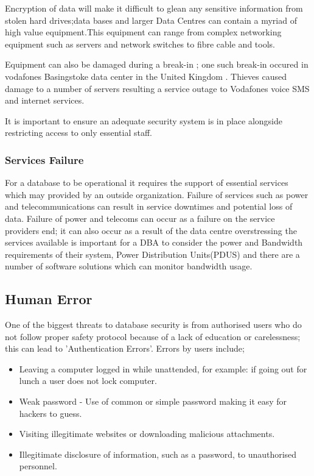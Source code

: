 \documentclass[11pt, twocolumn]{article}
\begin{document}
Encryption of data will make it  difficult to glean any sensitive information from stolen hard drives;data bases and larger Data Centres can contain a myriad of high value equipment.This equipment can range from complex networking equipment such as servers and network switches to fibre cable and tools.

Equipment can also be damaged during a break-in ; one such break-in occured in vodafones Basingstoke data center in the United Kingdom \cite{sean8}.  Thieves caused damage to a number of servers resulting a service outage to Vodafones voice SMS and internet services.

It is important to ensure an adequate security system is in place alongside restricting access to only essential staff.


\subsubsection{Services Failure}
For a database to be operational it requires the support of essential services which may provided by an outside organization.  Failure of services such as power and telecommunications can result in service downtimes and potential loss of data.  Failure of power and telecoms can occur as a failure on the service providers end; it can also occur as a result of the data centre overstressing the services available is important for a DBA to consider the power and Bandwidth requirements of their system, Power Distribution Units(PDUS) and there are a number of software solutions which can monitor bandwidth usage.


\subsection{Human Error}
One of the biggest threats to database security is from authorised users who do not follow proper safety protocol because of a lack of education or carelessness; this can lead to 'Authentication Errors'\cite{Thur}.  Errors by users include;

\begin{itemize}
\item Leaving a computer logged in while unattended, for example: if going out for lunch a user does not lock computer.
\item Weak password - Use of common or simple password making it easy for hackers to guess.
\item Visiting illegitimate websites or downloading malicious attachments.
\item Illegitimate disclosure of information, such as a password, to unauthorised personnel\cite{Bas}.
\end{itemize}
\end{document}
